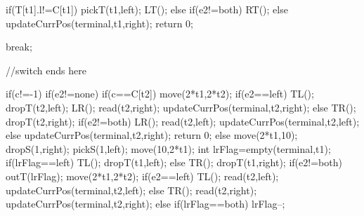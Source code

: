 {{{{{						if(T[t1].l!=C[t1])
                        {
                            pickT(t1,left);
                        }
                        LT();
                    }
                    else if(e2!=both)
                        RT();
					else
					{
						updateCurrPos(terminal,t1,right);
						return 0;
					}
					
                }
                break;
        }//switch ends here
        
		if(c!=-1)
        {
            if(e2!=none)
            {
                if(c==C[t2])
                {
                    move(2*t1,2*t2);
                    if(e2==left)
                    {
                        TL();
                        dropT(t2,left);
                        LR();
                        read(t2,right);
						updateCurrPos(terminal,t2,right);
                    }
                    else
                    {
                        TR();
                        dropT(t2,right);
                        if(e2!=both)
                        {
                            LR();
                            read(t2,left);
                            updateCurrPos(terminal,t2,left);
                        }
                        else
                        	updateCurrPos(terminal,t2,right);
                    }
                    return 0;
                }
                else
                {
                    move(2*t1,10);
                    dropS(1,right);
                    pickS(1,left);
                    move(10,2*t1);
                    int lrFlag=empty(terminal,t1);
                    if(lrFlag==left)
                    {
                        TL();
                        dropT(t1,left);
                    }
                    else
                    {
                        TR();
                        dropT(t1,right);
                    }
                    if(e2!=both)
                    {
                    	outT(lrFlag);
                        move(2*t1,2*t2);
                        if(e2==left)
                        {
                            TL();
                            read(t2,left);
                            updateCurrPos(terminal,t2,left);
                        }
                        else
                        {
                            TR();
                            read(t2,right);
                            updateCurrPos(terminal,t2,right);
                        }
                    }
                    else
                    {
                    	if(lrFlag==both)
                    		lrFlag--;
}}}}}}
